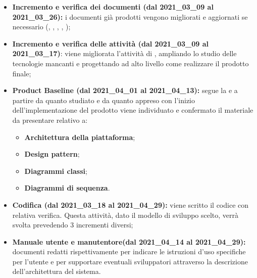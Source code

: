 \begin{itemize}
    \item \textbf{Incremento e verifica dei documenti (dal 2021\_03\_09 al 2021\_03\_26):} i documenti già prodotti vengono migliorati e aggiornati se necessario ({\NdP}, {\PdP}, {\Glossario}, {\PdQ}, {\AdR});
    \item \textbf{Incremento e verifica delle attività (dal 2021\_03\_09 al 2021\_03\_17)}: viene migliorata l'attività di , ampliando lo studio delle tecnologie mancanti e progettando ad alto livello come realizzare il prodotto finale;
    \item \textbf{Product Baseline (dal 2021\_04\_01 al 2021\_04\_13):} segue la  e a partire da quanto studiato e da quanto appreso con l'inizio dell'implementazione del prodotto viene individuato e confermato il materiale da presentare relativo a:
        \begin{itemize}
        	\item \textbf{Architettura della piattaforma};
            \item \textbf{Design pattern};
            \item \textbf{Diagrammi classi};
            \item \textbf{Diagrammi di sequenza}. 
        \end{itemize} 
    \item \textbf{Codifica (dal 2021\_03\_18 al 2021\_04\_29):} viene scritto il codice con relativa verifica. Questa attività, dato il modello di sviluppo scelto, verrà svolta prevedendo 3 incrementi diversi;
    \item \textbf{Manuale utente e manutentore(dal 2021\_04\_14 al 2021\_04\_29):} documenti redatti rispettivamente per indicare le istruzioni d'uso specifiche per l'utente e per supportare eventuali sviluppatori attraverso la descrizione dell'architettura del sistema.
\end{itemize}
